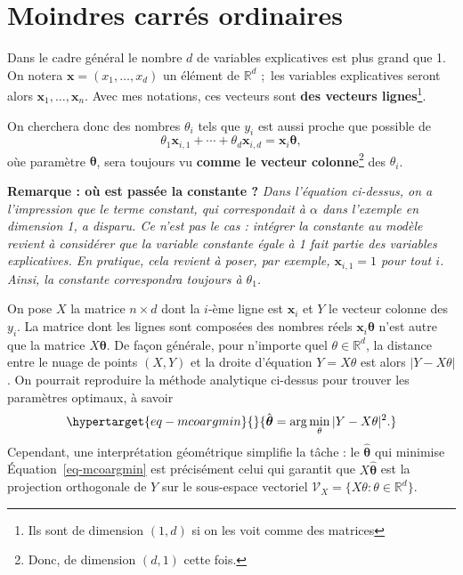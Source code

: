 \documentclass[
  10,
  letterpaper,
  DIV=11,
  numbers=noendperiod]{scrreport}
\newcommand{\bx}{\mathbf{x}}
\newcommand{\bt}{\boldsymbol{\theta}}
\theoremstyle{plain}
\theoremstyle{definition}
\theoremstyle{plain}
\theoremstyle{definition}
\theoremstyle{definition}
\theoremstyle{plain}
\theoremstyle{remark}
\begin{document}
\hypertarget{moindres-carruxe9s-ordinaires}{%
\section{Moindres carrés
ordinaires}\label{moindres-carruxe9s-ordinaires}}

Dans le cadre général le nombre \(d\) de variables explicatives est plus
grand que 1. On notera \(\bx = (x_1, \dotsc, x_d)\) un élément de
\(\mathbb{R}^d\) ;~les variables explicatives seront alors
\(\bx_1,\dotsc, \bx_n\). Avec mes notations, ces vecteurs sont
\textbf{des vecteurs lignes}\footnote{Ils sont de dimension \((1,d)\) si
  on les voit comme des matrices}.

On cherchera donc des nombres \(\theta_i\) tels que \(y_i\) est aussi
proche que possible de
\[\theta_1 \bx_{i,1} + \dotsb + \theta_d \bx_{i,d} = \bx_i \bt,  \] oùe
paramètre \(\bt\), sera toujours vu \textbf{comme le vecteur
colonne}\footnote{Donc, de dimension \((d,1)\) cette fois.} des
\(\theta_i\).

\textbf{Remarque : où est passée la constante ?} \emph{Dans l'équation
ci-dessus, on a l'impression que le terme constant, qui correspondait à
\(\alpha\) dans l'exemple en dimension 1, a disparu. Ce n'est pas le cas
: intégrer la constante au modèle revient à considérer que la variable
constante égale à 1 fait partie des variables explicatives. En pratique,
cela revient à poser, par exemple, \(\bx_{i,1} = 1\) pour tout \(i\).
Ainsi, la constante correspondra toujours à \(\theta_1\).}

On pose \(X\) la matrice \(n\times d\) dont la \(i\)-ème ligne est
\(\bx_i\) et \(Y\) le vecteur colonne des \(y_i\). La matrice dont les
lignes sont composées des nombres réels \(\bx_i \bt\) n'est autre que la
matrice \(X\bt\). De façon générale, pour n'importe quel
\(\theta \in \mathbb{R}^d\), la distance entre le nuage de points
\((X,Y)\) et la droite d'équation \(Y = X\theta\) est alors
\(|Y - X\theta|\). On pourrait reproduire la méthode analytique
ci-dessus pour trouver les paramètres optimaux, à savoir
\begin{equation}\protect\hypertarget{eq-mcoargmin}{}{\hat{\bt} = \arg \min_{\theta} |Y - X\theta|^2. }\label{eq-mcoargmin}\end{equation}
Cependant, une interprétation géométrique simplifie la tâche : le
\(\hat{\bt}\) qui minimise Équation~\ref{eq-mcoargmin} est précisément
celui qui garantit que \(X\hat{\bt}\) est la projection orthogonale de
\(Y\) sur le sous-espace vectoriel
\(\mathscr{V}_X = \{X\theta : \theta \in \mathbb{R}^d\}\).
\end{document}
